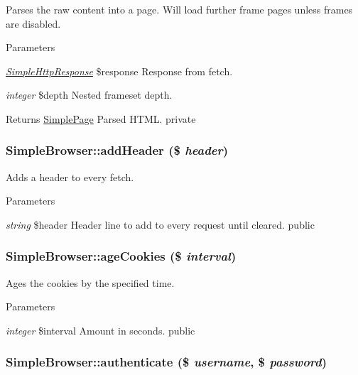 \label{class_simple_browser_aaa3c3ddf5ec5c06f50a5cd91ce5fe75d}
Parses the raw content into a page. Will load further frame pages unless frames are disabled. 
\begin{DoxyParams}{Parameters}
\item[{\em \hyperlink{class_simple_http_response}{SimpleHttpResponse}}]\$response Response from fetch. \item[{\em integer}]\$depth Nested frameset depth. \end{DoxyParams}
\begin{DoxyReturn}{Returns}
\hyperlink{class_simple_page}{SimplePage} Parsed HTML.  private 
\end{DoxyReturn}
\hypertarget{class_simple_browser_aa9cc6dc208dc7a3aa3a68dcaf3466063}{
\subsubsection[{addHeader}]{\setlength{\rightskip}{0pt plus 5cm}SimpleBrowser::addHeader (\$ {\em header})}}
\label{class_simple_browser_aa9cc6dc208dc7a3aa3a68dcaf3466063}
Adds a header to every fetch. 
\begin{DoxyParams}{Parameters}
\item[{\em string}]\$header Header line to add to every request until cleared.  public \end{DoxyParams}
\hypertarget{class_simple_browser_aefb6d3f834a1b34b91ea3a1329255739}{
\subsubsection[{ageCookies}]{\setlength{\rightskip}{0pt plus 5cm}SimpleBrowser::ageCookies (\$ {\em interval})}}
\label{class_simple_browser_aefb6d3f834a1b34b91ea3a1329255739}
Ages the cookies by the specified time. 
\begin{DoxyParams}{Parameters}
\item[{\em integer}]\$interval Amount in seconds.  public \end{DoxyParams}
\hypertarget{class_simple_browser_ae0f4f39b95050c895049df6d5e48b731}{
\subsubsection[{authenticate}]{\setlength{\rightskip}{0pt plus 5cm}SimpleBrowser::authenticate (\$ {\em username}, \/  \$ {\em password})}}
